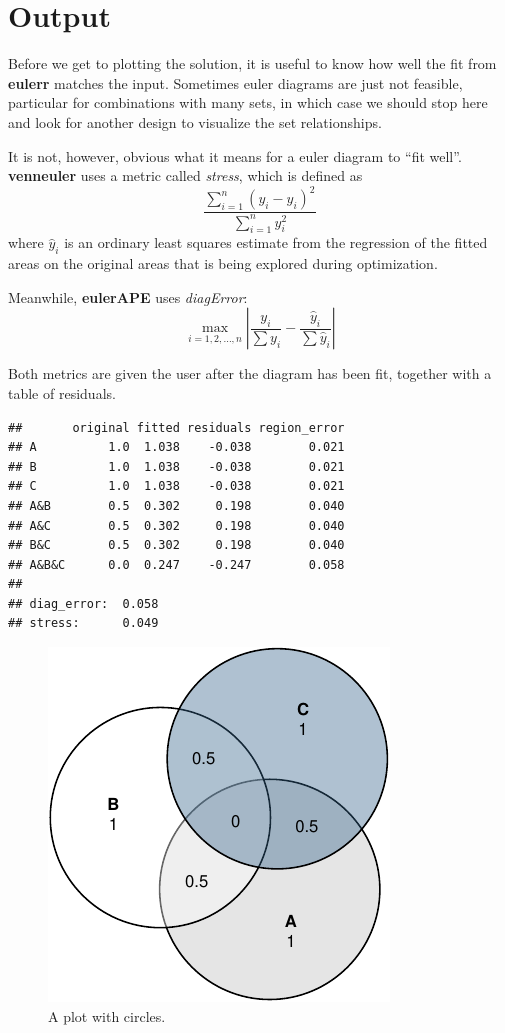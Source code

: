 \documentclass[
  headsepline=true,headings=standardclasses%
]{scrartcl}
\theoremstyle{definition}
\theoremstyle{definition}
\theoremstyle{definition}
\theoremstyle{remark}
\begin{document}
\section{Output}\label{output}

Before we get to plotting the solution, it is useful to know how well
the fit from \textbf{eulerr} matches the input. Sometimes euler diagrams
are just not feasible, particular for combinations with many sets, in
which case we should stop here and look for another design to visualize
the set relationships.

It is not, however, obvious what it means for a euler diagram to ``fit
well''. \textbf{venneuler} uses a metric called \emph{stress}, which is
defined as \[
\frac{\sum_{i=1}^{n} (y_i - \hat{y}_i) ^ 2}{\sum_{i=1}^{n} y_i ^ 2}
\] where \(\hat{y}_i\) is an ordinary least squares estimate from the
regression of the fitted areas on the original areas that is being
explored during optimization.

Meanwhile, \textbf{eulerAPE} \autocite{micallef_2014} uses
\emph{diagError}: \[
\max_{i = 1, 2, \dots, n} \left| \frac{y_i}{\sum y_i} -
  \frac{\hat{y}_i}{\sum \hat{y}_i} \right|
\]

Both metrics are given the user after the diagram has been fit, together
with a table of residuals.

\begin{verbatim}
##       original fitted residuals region_error
## A          1.0  1.038    -0.038        0.021
## B          1.0  1.038    -0.038        0.021
## C          1.0  1.038    -0.038        0.021
## A&B        0.5  0.302     0.198        0.040
## A&C        0.5  0.302     0.198        0.040
## B&C        0.5  0.302     0.198        0.040
## A&B&C      0.0  0.247    -0.247        0.058
## 
## diag_error:  0.058 
## stress:      0.049
\end{verbatim}

\begin{figure}
\centering
\includegraphics{thesis_files/figure-latex/unnamed-chunk-3-1.pdf}
\caption{\label{fig:unnamed-chunk-3}A plot with circles.}
\end{figure}
\end{document}
